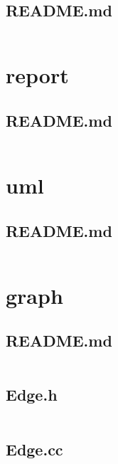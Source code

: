 \documentclass[../main.tex]{subfiles}
\begin{document}
\subsection{README.md}\label{lst:doc-readme-md}
\inputminted[breaklines=true]{text}{parts/code/doc/README.md}

\section{report}

\subsection{README.md}\label{lst:report-readme-md}
\inputminted[breaklines=true]{text}{parts/code/doc/report/README.md}

\section{uml}

\subsection{README.md}\label{lst:uml-readme-md}
\inputminted[breaklines=true]{text}{parts/code/doc/uml/README.md}

\section{graph}

\subsection{README.md}\label{lst:graph-readme-md}
\inputminted[breaklines=true]{text}{parts/code/graph/README.md}

\subsection{Edge.h}\label{lst:graph-edge-h}
\inputminted[linenos=true]{cpp}{parts/code/graph/Edge.h}

\subsection{Edge.cc}\label{lst:graph-edge-cc}
\inputminted[linenos=true]{cpp}{parts/code/graph/Edge.cc}
\end{document}
